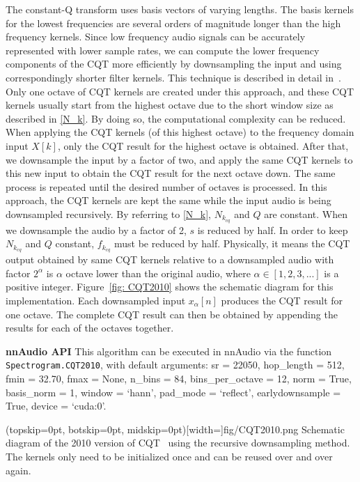 \documentclass{ieeeaccess}
\newcommand{\nbh}[1]{\texttt{#1}}
\begin{document}
The constant-Q transform uses basis vectors of varying lengths. The basis kernels for the lowest frequencies are several orders of magnitude longer than the high frequency kernels. Since low frequency audio signals can be accurately represented with lower sample rates, we can compute the lower frequency components of the CQT more efficiently by downsampling the input and using correspondingly shorter filter kernels. This technique is described in detail in~\cite{schorkhuber2010constant, brown1991calculation}. Only one octave of CQT kernels are created under this approach, and these CQT kernels usually start from the highest octave due to the short window size as described in \eqref{N_k}. By doing so, the computational complexity can be reduced. When applying the CQT kernels (of this highest octave) to the frequency domain input $X[k]$, only the CQT result for the highest octave is obtained. After that, we downsample the input by a factor of two, and apply the same CQT kernels to this new input to obtain the CQT result for the next octave down. The same process is repeated until the desired number of octaves is processed. In this approach, the CQT kernels are kept the same while the input audio is being downsampled recursively. By referring to \eqref{N_k}, $N_{k_{cq}}$ and $Q$ are constant. When we downsample the audio by a factor of 2, $s$ is reduced by half. In order to keep $N_{k_{cq}}$ and $Q$ constant, $f_{k_{cq}}$ must be reduced by half. Physically, it means the CQT output obtained by same CQT kernels relative to a downsampled audio with factor $2^\alpha$ is $\alpha$ octave lower than the original audio, where $\alpha \in [1,2,3,...]$ is a positive integer. Figure~\ref{fig: CQT2010} shows the schematic diagram for this implementation. Each downsampled input $x_\alpha[n]$ produces the CQT result for one octave. The complete CQT result can then be obtained by appending the results for each of the octaves together.



\hspace{11pt} 

\noindent \textbf{nnAudio API} This algorithm can be executed in nnAudio via the function \nbh{Spectrogram.CQT2010}, with default arguments: sr = 22050, hop\_length = 512, fmin = 32.70, fmax = None, n\_bins = 84, bins\_per\_octave = 12, norm = True, basis\_norm = 1, window = `hann', pad\_mode = `reflect', earlydownsample = True, device = `cuda:0'.

\Figure(topskip=0pt, botskip=0pt, midskip=0pt)[width=\linewidth]{fig/CQT2010.png}
{Schematic diagram of the 2010 version of CQT~\cite{schorkhuber2010constant, brown1991calculation} using the recursive downsampling method. The kernels  only need to be initialized once and can be reused over and over again. \label{fig: CQT2010}}
\end{document}
